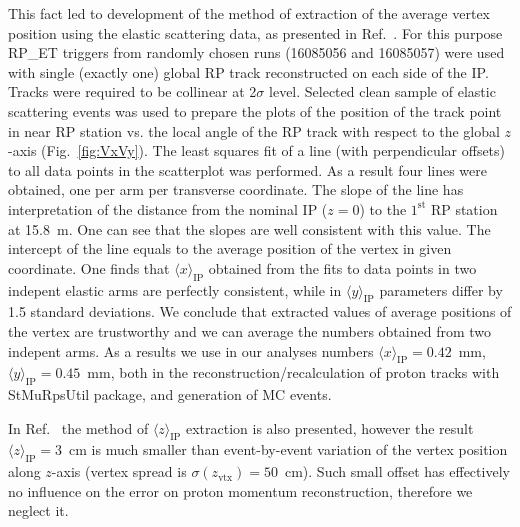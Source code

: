 This fact led to development of the method of extraction of the average vertex position using the elastic scattering data, as presented in Ref.~\cite{AverageVertex}. For this purpose RP\_ET triggers from randomly chosen runs (16085056 and 16085057) were used with single (exactly one) global RP track reconstructed on each side of the IP. Tracks were required to be collinear at 2$\sigma$ level. Selected clean sample of elastic scattering events was used to prepare the plots of the position of the track point in near RP station vs. the local angle of the RP track with respect to the global $z$-axis (Fig.~\ref{fig:VxVy}). The least squares fit of a line (with perpendicular offsets) to all data points in the scatterplot was performed. As a result four lines were obtained, one per arm per transverse coordinate. The slope of the line has interpretation of the distance from the nominal IP ($z=0$) to the $1^{\text{st}}$ RP station at 15.8~m. One can see that the slopes are well consistent with this value. The intercept of the line equals to the average position of the vertex in given coordinate. One finds that $\langle x\rangle_{\text{IP}}$ obtained from the fits to data points in two indepent elastic arms are perfectly consistent, while in $\langle y\rangle_{\text{IP}}$ parameters differ by 1.5 standard deviations. We conclude that extracted values of average positions of the vertex are trustworthy and we can average the numbers obtained from two indepent arms. As a results we use in our analyses numbers $\langle x\rangle_{\text{IP}} = 0.42$~mm, $\langle y\rangle_{\text{IP}} = 0.45$~mm, both in the reconstruction/recalculation of proton tracks with StMuRpsUtil package, and generation of MC events.

In Ref.~\cite{AverageVertex} the method of $\langle z\rangle_{\text{IP}}$ extraction is also presented, however the result $\langle z\rangle_{\text{IP}}= 3$~cm is much smaller than event-by-event variation of the vertex position along $z$-axis (vertex spread is $\sigma(z_{\text{vtx}})=50$~cm). Such small offset has effectively no influence on the error on proton momentum reconstruction, therefore we neglect it.

